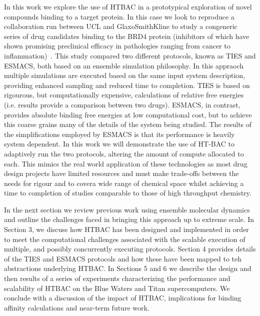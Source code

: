 In this work we explore the use of HTBAC in a prototypical exploration of novel 
compounds binding to a target protein.
In this case we look to reproduce a collaboration run between UCL and GlaxoSmithKline 
to study a congeneric series of drug candidates binding to the BRD4 protein (inhibitors 
of which have shown promising preclinical efficacy in pathologies ranging from cancer to
inflammation)~\cite{Wan2017brd4}.
This study compared two different protocols, known as TIES and ESMACS, both based on an 
ensemble simulation philosophy.
In this appraoch multiple simulations are executed based on the same input system description, 
providing enhanced sampling and reduced time to completion.
TIES is based on rigourous, but computationally expensive, calculations of relative free
energies (i.e. results provide a comparison between two drugs).
ESMACS, in contrast, provides absolute binding free energies at low computational cost, 
but to achieve this coarse grains many of the details of the system being studied.
The results of the simplifications employed by ESMACS is that its performance is heavily 
system dependent.
In this work we will demonstrate the use of HT-BAC to adaptively run the 
two protocols, altering the amount of compute allocated to each.
This mimics the real world application of these technologies as most drug design 
projects have limited resources and must make trade-offs between the needs for rigour
and to covera wide range of chemical space whilst achieving a time to completion of studies 
comparable to those of high throughput chemistry.

In the next section we review previous work using ensemble molecular dynamics and outline 
the challenges faced in bringing this approach up to extreme scale.
In Section 3, we discuss how HTBAC has been designed and implemented in order to meet the 
computational challenges associated with the scalable execution of multiple, and possibly 
concurrently executing protocols. 
Section 4 provides details of the TIES and ESMACS protocols and how these have been mapped 
to teh abstractions underlying HTBAC. 
In Sections 5 and 6 we describe the design and then results of a series of experiments 
characterizing the performance and scalability of HTBAC on the Blue Waters and Titan 
supercomputers.
We conclude with a discussion of the impact of HTBAC, implications for binding
affinity calculations and near-term future work.
